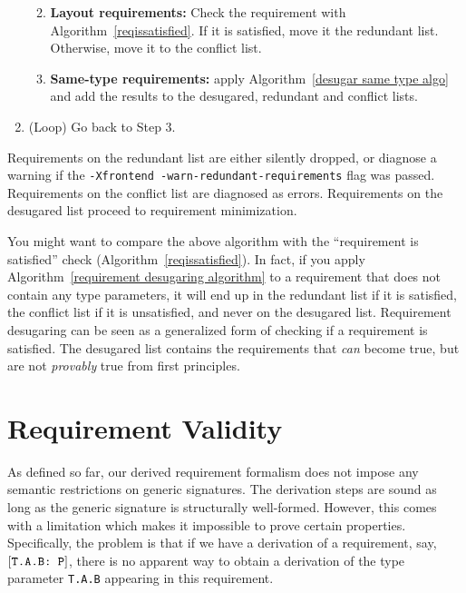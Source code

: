 \documentclass[../generics]{subfiles}
\begin{document}
\begin{algorithm}
\begin{enumerate}
\begin{enumerate}
\begin{enumerate}
\end{enumerate}
\item \textbf{Layout requirements:} Check the requirement with Algorithm~\ref{reqissatisfied}. If it is satisfied, move it the redundant list. Otherwise, move it to the conflict list.
\item \textbf{Same-type requirements:} apply Algorithm~\ref{desugar same type algo} and add the results to the desugared, redundant and conflict lists.
\end{enumerate}
\item (Loop) Go back to Step 3.
\end{enumerate}
Requirements on the redundant list are either silently dropped, or diagnose a warning if the \verb|-Xfrontend -warn-redundant-requirements| flag was passed. Requirements on the conflict list are diagnosed as errors. Requirements on the desugared list proceed to requirement minimization.
\end{algorithm}

You might want to compare the above algorithm with the ``requirement is satisfied'' check (Algorithm~\ref{reqissatisfied}). In fact, if you apply Algorithm~\ref{requirement desugaring algorithm} to a requirement that does not contain any type parameters, it will end up in the redundant list if it is satisfied, the conflict list if it is unsatisfied, and never on the desugared list. Requirement desugaring can be seen as a generalized form of checking if a requirement is satisfied. The desugared list contains the requirements that \emph{can} become true, but are not \emph{provably} true from first principles.

\section{Requirement Validity}\label{generic signature validity}

As defined so far, our derived requirement formalism does not impose any semantic restrictions on generic signatures. The derivation steps are sound as long as the generic signature is structurally well-formed. However, this comes with a limitation which makes it impossible to prove certain properties. Specifically, the problem is that if we have a derivation of a requirement, say, $[\texttt{T.A.B:~P}]$, there is no apparent way to obtain a derivation of the type parameter \texttt{T.A.B} appearing in this requirement.
\end{document}
